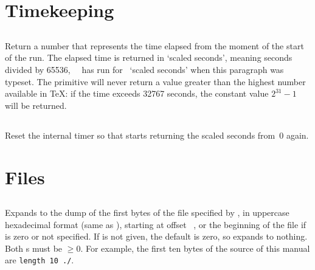 \documentclass{pdftexmanual}
\begin{document}
\section{Timekeeping}

\subsection{}

Return a number that represents the time elapsed from the moment of the
start of the run. The elapsed time is returned in `scaled seconds',
meaning seconds divided by 65536, \eg\ \PDFTEX\ has run for
\the\pdfelapsedtime\ `scaled seconds' when this paragraph was typeset.
The primitive will never return a value greater than the highest number
available in \TeX: if the time exceeds 32767 seconds, the constant value
$2^{31}-1$ will be returned. 

\subsection{}

Reset the internal timer so that 
starts returning the scaled seconds from~0 again. 

\section{Files}

\subsection{}

Expands to the dump of the first   bytes
of the file specified by , in uppercase
hexadecimal format (same as ), starting at offset
~, or the beginning of the file if
 is zero or not specified. If  is not given,
the default is zero, so expands to nothing. Both s
must be $\ge0$. For example, the first ten bytes of the source of this
manual are {\tt\pdffiledump length 10 {./\jobname}}.
\end{document}
